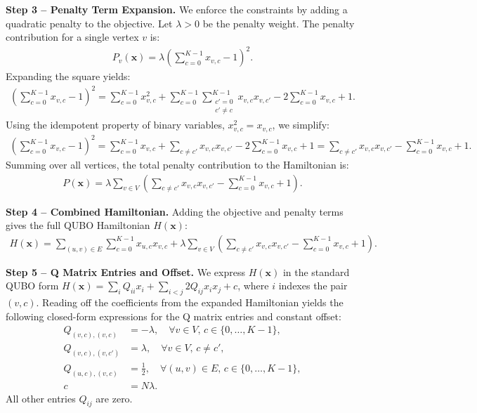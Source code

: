 \documentclass[12pt]{article}
\begin{document}
\textbf{Step 3 -- Penalty Term Expansion.}
We enforce the constraints by adding a quadratic penalty to the objective. Let $\lambda > 0$ be the penalty weight. The penalty contribution for a single vertex $v$ is:
\begin{align}
    P_v(\mathbf{x}) = \lambda \left( \sum_{c=0}^{K-1} x_{v,c} - 1 \right)^2.
\end{align}
Expanding the square yields:
\begin{align}
    \left( \sum_{c=0}^{K-1} x_{v,c} - 1 \right)^2 = \sum_{c=0}^{K-1} x_{v,c}^2 + \sum_{c=0}^{K-1} \sum_{\substack{c'=0 \\ c' \neq c}}^{K-1} x_{v,c} x_{v,c'} - 2 \sum_{c=0}^{K-1} x_{v,c} + 1.
\end{align}
Using the idempotent property of binary variables, $x_{v,c}^2 = x_{v,c}$, we simplify:
\begin{align}
    \left( \sum_{c=0}^{K-1} x_{v,c} - 1 \right)^2 = \sum_{c=0}^{K-1} x_{v,c} + \sum_{c \neq c'} x_{v,c} x_{v,c'} - 2 \sum_{c=0}^{K-1} x_{v,c} + 1 = \sum_{c \neq c'} x_{v,c} x_{v,c'} - \sum_{c=0}^{K-1} x_{v,c} + 1.
\end{align}
Summing over all vertices, the total penalty contribution to the Hamiltonian is:
\begin{align}
    P(\mathbf{x}) = \lambda \sum_{v \in V} \left( \sum_{c \neq c'} x_{v,c} x_{v,c'} - \sum_{c=0}^{K-1} x_{v,c} + 1 \right).
\end{align}

\textbf{Step 4 -- Combined Hamiltonian.}
Adding the objective and penalty terms gives the full QUBO Hamiltonian $H(\mathbf{x})$:
\begin{align}
    H(\mathbf{x}) = \sum_{(u,v) \in E} \sum_{c=0}^{K-1} x_{u,c} x_{v,c} + \lambda \sum_{v \in V} \left( \sum_{c \neq c'} x_{v,c} x_{v,c'} - \sum_{c=0}^{K-1} x_{v,c} + 1 \right).
\end{align}

\textbf{Step 5 -- Q Matrix Entries and Offset.}
We express $H(\mathbf{x})$ in the standard QUBO form $H(\mathbf{x}) = \sum_{i} Q_{ii} x_i + \sum_{i < j} 2 Q_{ij} x_i x_j + c$, where $i$ indexes the pair $(v,c)$. Reading off the coefficients from the expanded Hamiltonian yields the following closed-form expressions for the Q matrix entries and constant offset:
\begin{align}
    Q_{(v,c),(v,c)} &= -\lambda, \quad \forall v \in V, \, c \in \{0,\dots,K-1\}, \\
    Q_{(v,c),(v,c')} &= \lambda, \quad \forall v \in V, \, c \neq c', \\
    Q_{(u,c),(v,c)} &= \frac{1}{2}, \quad \forall (u,v) \in E, \, c \in \{0,\dots,K-1\}, \\
    c &= N \lambda.
\end{align}
All other entries $Q_{ij}$ are zero.
\end{document}
